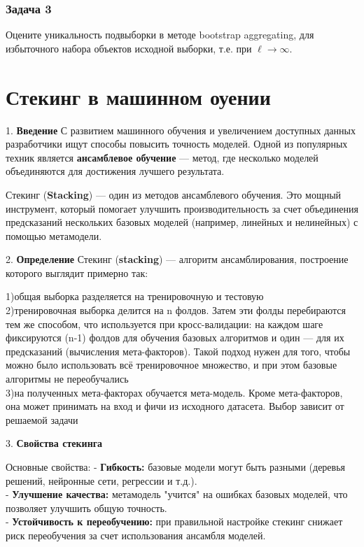 \subsubsection*{Задача 3}
Оцените уникальность подвыборки в методе bootstrap aggregating, для избыточного набора объектов исходной выборки, т.е. при $\ell \to \infty$.



\section{Стекинг в машинном оуении}


1. \textbf{Введение}
С развитием машинного обучения и увеличением доступных данных разработчики ищут способы повысить точность моделей. Одной из популярных техник является \textbf{ансамблевое обучение} — метод, где несколько моделей объединяются для достижения лучшего результата.

Стекинг (\textbf{Stacking}) — один из методов ансамблевого обучения. Это мощный инструмент, который помогает улучшить производительность за счет объединения предсказаний нескольких базовых моделей (например, линейных и нелинейных) с помощью метамодели.

2. \textbf{Определение}
Стекинг (\textbf{stacking}) — алгоритм ансамблирования, построение которого выглядит примерно так:

1)общая выборка разделяется на тренировочную и тестовую\\
2)тренировочная выборка делится на n фолдов. Затем эти фолды перебираются тем же способом, что используется при кросс-валидации: на каждом шаге фиксируются (n-1)  фолдов для обучения базовых алгоритмов и один — для их предсказаний (вычисления мета-факторов). Такой подход нужен для того, чтобы можно было использовать всё тренировочное множество, и при этом базовые алгоритмы не переобучались\\
3)на полученных мета-факторах обучается мета-модель. Кроме мета-факторов, она может принимать на вход и фичи из исходного датасета. Выбор зависит от решаемой задачи


3. \textbf{Свойства стекинга}

Основные свойства:
- \textbf{Гибкость:} базовые модели могут быть разными (деревья решений, нейронные сети, регрессии и т.д.). \\
- \textbf{Улучшение качества:} метамодель "учится" на ошибках базовых моделей, что позволяет улучшить общую точность.  \\
- \textbf{Устойчивость к переобучению:} при правильной настройке стекинг снижает риск переобучения за счет использования ансамбля моделей.  \\


